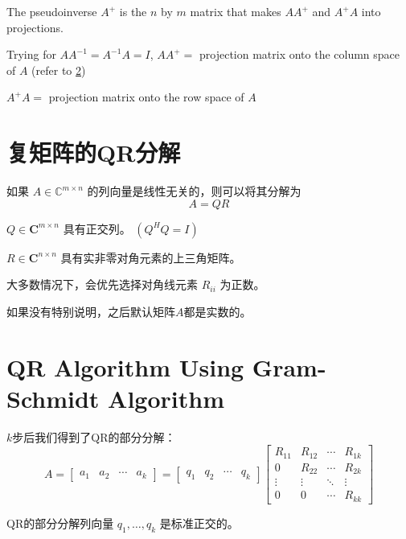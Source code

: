 \begin{figure}[htbp]
\begin{tikzpicture}[x=0.75pt,y=0.75pt,yscale=-1,xscale=1]
\end{tikzpicture}
\end{figure}

The pseudoinverse $ A^{+} $ is the $ n $ by $ m $ matrix that makes $ A A^{+} $ and $ A^{+} A $ into projections. 

\begin{remark}
    Trying for $ A A^{-1}=A^{-1} A=I $, $ A A^{+}= $ projection matrix onto the column space of $ A $ (refer to \ref{})

    $ A^{+} A= $ projection matrix onto the row space of $ A $
\end{remark}

\section{复矩阵的QR分解}

\begin{theorem}
    如果 $A \in \mathbb{C}^{m \times n}$ 的列向量是线性无关的，则可以将其分解为
$$
A=Q R
$$

$Q \in \boldsymbol{C}^{m \times n}$ 具有正交列。 $\left(Q^{H} Q=I\right)$

$R \in \boldsymbol{C}^{n \times n}$ 具有实非零对角元素的上三角矩阵。
\end{theorem}

大多数情况下，会优先选择对角线元素 $R_{i i}$ 为正数。

如果没有特别说明，之后默认矩阵$A$都是实数的。

\section{QR Algorithm Using Gram-Schmidt Algorithm}

$k$步后我们得到了QR的部分分解：
$$
A=\left[\begin{array}{llll}
a_{1} & a_{2} & \cdots & a_{k}
\end{array}\right]=\left[\begin{array}{llll}
q_{1} & q_{2} & \cdots & q_{k}
\end{array}\right]\left[\begin{array}{cccc}
R_{11} & R_{12} & \cdots & R_{1 k} \\
0 & R_{22} & \cdots & R_{2 k} \\
\vdots & \vdots & \ddots & \vdots \\
0 & 0 & \cdots & R_{k k}
\end{array}\right]
$$

\begin{corollary}
    QR的部分分解列向量 $q_{1}, \ldots, q_{k}$ 是标准正交的。
\end{corollary}


